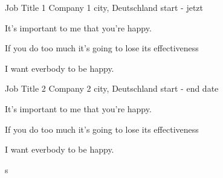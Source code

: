 

\begin{cventries}
  \cventry
    {Job Title 1 } %
    {Company 1} %
    {city, Deutschland} %
    {start - jetzt} %
    {
      \begin{cvitems} %
      	\item {It's important to me that you're happy.}
      	\item { If you do too much it's going to lose its effectiveness}
        \item {I want everbody to be happy.}
      \end{cvitems}
    }

  \cventry
    {Job Title 2 } %
    {Company 2} %
    {city, Deutschland} %
    {start - end date} %
    {
      \begin{cvitems} %
      	\item {It's important to me that you're happy.}
      	\item { If you do too much it's going to lose its effectiveness}
        \item {I want everbody to be happy.}
      \end{cvitems}
    }s
	

\end{cventries}
